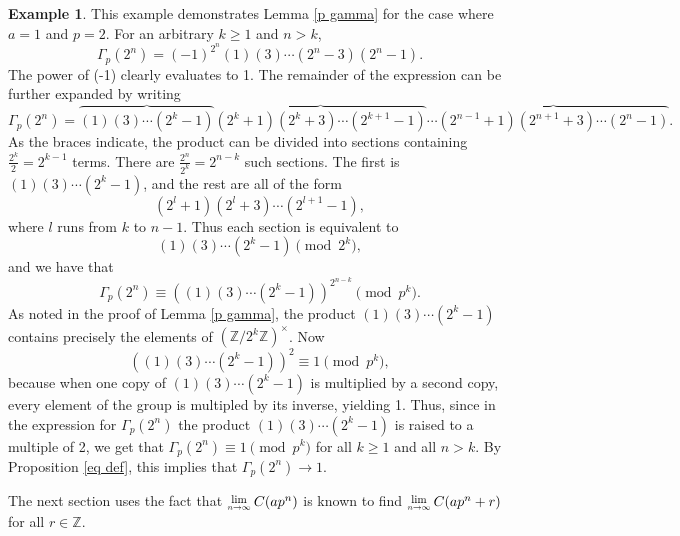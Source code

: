 \documentclass[12pt, letter]{article}    %
\theoremstyle{plain}
\theoremstyle{definition}
\newtheorem{example}[theorem]{Example}
\numberwithin{equation}{section}
\newcommand{\Lim}[1]{\raisebox{0.5ex}{\scalebox{0.8}{$\displaystyle \lim_{#1}\;$}}}
\newcommand{\thref}[1]{Theorem \ref{#1}}
\newcommand{\lemref}[1]{Lemma \ref{#1}}
\newcommand{\propref}[1]{Proposition \ref{#1}}
\begin{document}
\begin{example} This example demonstrates \lemref{p gamma} for the case where $a=1$ and $p=2$. For an arbitrary $k\geq1$ and $n>k$, 
$$\Gamma_p(2^n)=(-1)^{2^n}(1)(3)\cdots(2^n-3)(2^n-1).$$ The power of (-1) clearly evaluates to 1. The remainder of the expression can be further expanded by writing
$$\Gamma_p(2^n)=\overbrace{(1)(3)\cdots(2^k-1)}\overbrace{(2^k+1)(2^k+3)\cdots(2^{k+1}-1)}\cdots\overbrace{(2^{n-1}+1)(2^{n+1}+3)\cdots(2^n-1)}.$$ As the braces indicate, the product can be divided into sections containing $\frac{2^k}{2}=2^{k-1}$ terms. There are $\frac{2^n}{2^k}=2^{n-k}$ such sections. The first is $(1)(3)\cdots(2^k-1)$, and the rest are all of the form $$(2^l+1)(2^l+3)\cdots(2^{l+1}-1),$$ where $l$ runs from $k$ to $n-1$. Thus each section is equivalent to $$(1)(3)\cdots(2^k-1)\pmod{2^k},$$ and we have that $$\Gamma_p(2^n)\equiv\left((1)(3)\cdots(2^k-1)\right)^{2^{n-k}}\pmod{p^k}.$$ As noted in the proof of \lemref{p gamma}, the product $(1)(3)\cdots(2^k-1)$ contains precisely the elements of $(\mathbb{Z}/2^k\mathbb{Z})^\times$. Now $$\left((1)(3)\cdots(2^k-1)\right)^2\equiv 1\pmod{p^k},$$ because when one copy of $(1)(3)\cdots(2^k-1)$ is multiplied by a second copy, every element of the group is multipled by its inverse, yielding 1. Thus, since in the expression for $\Gamma_p(2^n)$ the product $(1)(3)\cdots(2^k-1)$ is raised to a multiple of 2, we get that $\Gamma_p(2^n)\equiv 1\pmod{p^k}$ for all $k\geq1$ and all $n>k$. By \propref{eq def}, this implies that $\Gamma_p(2^n)\rightarrow 1.$
\end{example}

The next section uses the fact that $\Lim{n\rightarrow\infty}C(ap^n)$ is known to find $\Lim{n\rightarrow\infty}C(ap^n+r)$ for all $r\in\mathbb{Z}$.



\end{document}
